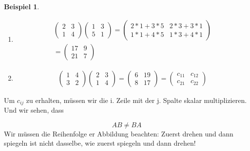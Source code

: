 \documentclass[a4paper,10pt]{report}
\newtheorem{myexample}{Beispiel}
\newenvironment{mathbox}
{\par\smallskip\centering\begin{lrbox}{0}%
\begin{minipage}[c]{\textwidth}}
{\end{minipage}\end{lrbox}%
\framebox[\textwidth]{\usebox{0}}%
\par\medskip
\ignorespacesafterend}
\begin{document}
\begin{myexample}
	\begin{enumerate}
		\item
		\begin{eqnarray*}
			\begin{pmatrix}2&3\\1&4\end{pmatrix}\begin{pmatrix}1&3\\5&1\end{pmatrix} = \begin{pmatrix}2*1 +3*5 & 2*3+3*1\\1*1+4*5&1*3+4*1\end{pmatrix}\\
			= \begin{pmatrix}17&9\\21&7\end{pmatrix}
		\end{eqnarray*}
		\item
		\begin{eqnarray*}
			\begin{pmatrix}1&4\\3&2\end{pmatrix}\begin{pmatrix}2&3\\1&4\end{pmatrix} = \begin{pmatrix}6&19\\8&17\end{pmatrix}= \begin{pmatrix}c_{11}&c_{12}\\c_{21}&c_{22}\end{pmatrix} 
		\end{eqnarray*}
	\end{enumerate}
\end{myexample}
\noindent
Um $c_{ij}$ zu erhalten, müssen wir die i. Zeile mit der j. Spalte skalar multiplizieren.\\
Und wir sehen, dass
\begin{mathbox}
	\begin{equation*}
		AB \not = BA
	\end{equation*}
	Wir müssen die Reihenfolge er Abbildung beachten: Zuerst drehen und dann spiegeln ist nicht dasselbe, wie zuerst spiegeln und dann drehen!
\end{mathbox}
\end{document}

